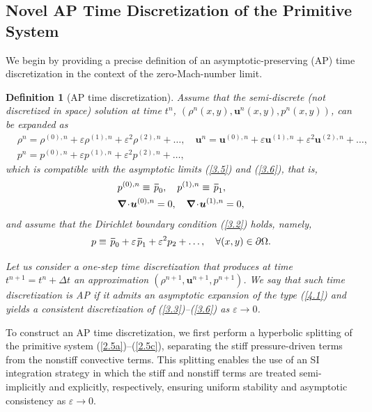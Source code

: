 \documentclass[preprint,12pt]{elsarticle}
\newtheorem{definition}{Definition}[section]
\def\bnabla{\bm{\nabla}}
\newcommand{\dt}{\Delta t}
\newcommand{\ve}{\varepsilon}
\newcommand\eref[1]{(\ref{#1})}
\newcommand*\xbar[1]{%
	\hbox{%
		\vbox{%
			\hrule height 0.5pt %
			\kern0.4ex%
			\hbox{%
				\kern-0.05em%
				\ensuremath{#1}%
				\kern-0.00em%
			}%
		}%
	}%
}
\begin{document}
\subsection{Novel AP Time Discretization of the Primitive System}\label{sec411}
We begin by providing a precise definition of an asymptotic-preserving (AP) time discretization in the context of the zero-Mach-number
limit.
\begin{definition}[AP time discretization]\label{def41}
	Assume that the {\color{black}semi-discrete (not discretized in space) solution at time $t^n$, $(\rho^n(x,y),\bm u^n(x,y),p^n(x,y))$,} can be
	expanded as
	\begin{equation}
		\begin{aligned}
			&\rho^n=\rho^{(0),n}+\ve\rho^{(1),n}+\ve^2\rho^{(2),n}+\dots,\quad\bm u^n=\bm u^{(0),n}+\ve\bm u^{(1),n}+\ve^2\bm u^{(2),n}+\dots,\\
			&p^n=p^{(0),n}+\ve p^{(1),n}+\ve^2p^{(2),n}+\dots,
		\end{aligned}
		\label{4.1}
	\end{equation}
	which is compatible with the asymptotic limits \eref{3.5} and \eref{3.6}, that is,
	\begin{align}
		&p^{(0),n}\equiv\,\xbar p_0,\quad p^{(1),n}\equiv\,\xbar p_1,\label{3.2f}\\
		&\bnabla\!\cdot\!\bm u^{(0),n}=0,\quad\bnabla\!\cdot\!\bm u^{(1),n}=0,\label{4.2}
	\end{align}
	and assume that the Dirichlet boundary condition \eref{3.2} holds, namely,
	\begin{equation}
		p\equiv\,\xbar p_0+\ve\,\xbar p_1+\ve^2p_2+\dots,\quad\forall(x,y)\in\partial\Omega.
		\label{3.4f}
	\end{equation}
	
	Let us consider a one-step time discretization that produces at time $t^{n+1}=t^n+\dt$ an approximation $(\rho^{n+1},\bm u^{n+1},p^{n+1})$.
	We say that such time discretization is AP if it admits an asymptotic expansion of the type \eref{4.1} and yields a consistent
	discretization of \eref{3.3}--\eref{3.6} as $\ve\to0$.
\end{definition}

To construct an AP time discretization, we first perform a hyperbolic splitting of the primitive system \eref{2.5a}–\eref{2.5c}, separating
the stiff pressure-driven terms from the nonstiff convective terms. This splitting enables the use of an SI integration strategy in which
the stiff and nonstiff terms are treated semi-implicitly and explicitly, respectively, ensuring uniform stability and asymptotic consistency
as $\ve\to0$.
\end{document}
